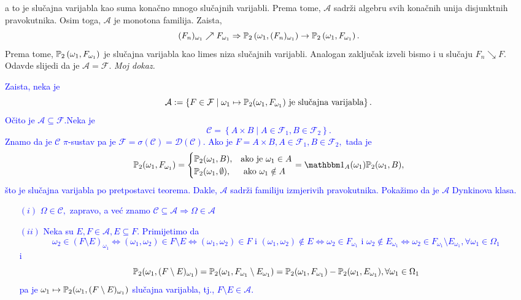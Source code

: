 \documentclass{article}
\begin{document}
a to je slučajna varijabla kao suma konačno mnogo slučajnih varijabli. Prema tome, \(\mathcal A\) sadrži algebru svih konačnih unija disjunktnih pravokutnika. Osim toga, \(\mathcal A\) je monotona familija. Zaista, \[(F_n)_{\omega_1}\nearrow F_{\omega_1}\Rightarrow\Bbb P_2\left(\omega_1, (F_n)_{\omega_1}\right)\to\Bbb P_2\left(\omega_1, F_{\omega_1}\right).\]
Prema tome, \(\Bbb P_2\left(\omega_1, F_{\omega_1}\right)\) je slučajna varijabla kao limes niza slučajnih varijabli. Analogan zaključak izveli bismo i u slučaju \(F_n\searrow F\). Odavde slijedi da je \(\mathcal A=\mathcal F\).\newline\newline
\textit{Moj dokaz.}\newline
\textcolor{Blue}{Zaista, neka je \[\mathcal A:=\left\{F\in\mathcal F\mid \omega_1\mapsto\Bbb P_2(\omega_1,F_{\omega_1})\text{ je slučajna varijabla}\right\}.\] Očito je \(\mathcal A\subseteq\mathcal F.\)\newline Neka je \[\mathcal C=\left\{A\times B\mid A\in\mathcal F_1,B\in\mathcal F_2\right\}.\] Znamo da je \(\mathcal C\) \(\pi\)-sustav pa je \(\mathcal F=\sigma(\mathcal C)=\mathscr D(\mathcal C).\)  Ako je \(F=A\times B,A\in\mathcal F_1,B\in\mathcal F_2,\) tada je \[\Bbb P_2(\omega_1,F_{\omega_1})=\begin{cases}\Bbb P_2(\omega_1,B),&\text{ako je }\omega_1\in A\\\Bbb P_2(\omega_1,\emptyset),&\text{ ako }\omega_1\notin A\end{cases}=\mathbbm 1_A(\omega_1)\Bbb P_2(\omega_1,B),\] što je slučajna varijabla po pretpostavci teorema.  Dakle, \(\mathcal A\) sadrži familiju izmjerivih pravokutnika. Pokažimo da je \(\mathcal A\) Dynkinova klasa. \newline
\begin{itemize}
    \item[\((i)\)] \(\Omega\in\mathcal C,\) zapravo, a već znamo \(\mathcal C\subseteq\mathcal A\Rightarrow\Omega\in\mathcal A\)
    \item[\((ii)\)] Neka su \(E,F\in\mathcal A, E\subseteq F.\) Primijetimo da \[\omega_2\in(F\setminus E)_{\omega_1}\Leftrightarrow(\omega_1,\omega_2)\in F\setminus E\Leftrightarrow(\omega_1,\omega_2)\in F\text{ i }(\omega_1,\omega_2)\notin E\Leftrightarrow\omega_2\in F_{\omega_1}\text{ i }\omega_2\notin E_{\omega_1}\Leftrightarrow\omega_2\in F_{\omega_1}\setminus E_{\omega_1},\forall\omega_1\in\Omega_1\] i \[\Bbb P_2(\omega_1,(F\setminus E)_{\omega_1})=\Bbb P_2(\omega_1,F_{\omega_1}\setminus E_{\omega_1})=\Bbb P_2(\omega_1,F_{\omega_1})-\Bbb P_2(\omega_1,E_{\omega_1}),\forall\omega_1\in\Omega_1\] pa je \(\omega_1\mapsto\Bbb P_2(\omega_1,(F\setminus E)_{\omega_1})\) slučajna varijabla, tj., \(F\setminus E\in\mathcal A.\)

\end{itemize}}
\end{document}
